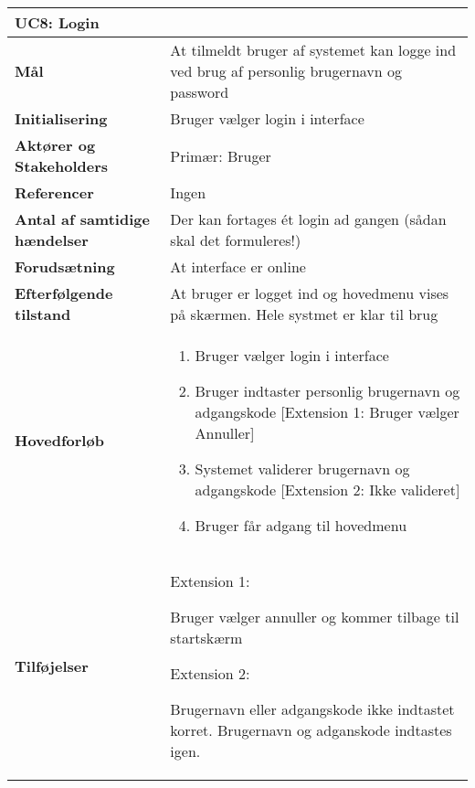 \begin{table}[H] \centering
\begin{tabular}{|p{6cm}|p{8cm}|}
	\hline
\multicolumn{2}{|l|}{\textbf{UC8: Login}} \\\hline
\textbf{Mål}								
&At tilmeldt bruger af systemet kan logge ind ved brug af personlig brugernavn og password
 \\\hline
\textbf{Initialisering}					
&Bruger vælger login i interface
 \\\hline
\textbf{Aktører og Stakeholders}			
&Primær: Bruger
 \\\hline
\textbf{Referencer}						
&Ingen
 \\\hline
\textbf{Antal af samtidige hændelser}	
&Der kan fortages ét login ad gangen (sådan skal det formuleres!)
 \\\hline
\textbf{Forudsætning}					
&At interface er online
 \\\hline
\textbf{Efterfølgende tilstand}			
&At bruger er logget ind og hovedmenu vises på skærmen. Hele systmet er klar til brug
 \\\hline
\textbf{Hovedforløb}						
& 
\begin{enumerate}

\item Bruger vælger login i interface

\item Bruger indtaster personlig brugernavn og adgangskode [Extension 1: Bruger vælger Annuller]

\item Systemet validerer brugernavn og adgangskode [Extension 2: Ikke valideret]

\item Bruger får adgang til hovedmenu
 
\end{enumerate}
\\\hline

\textbf{Tilføjelser}						&

Extension 1:

Bruger vælger annuller og kommer tilbage til startskærm

Extension 2: 

Brugernavn eller adgangskode ikke indtastet korret. Brugernavn og adganskode indtastes igen. \\\hline
	\end{tabular}
	\label{UC8} 
\end{table}